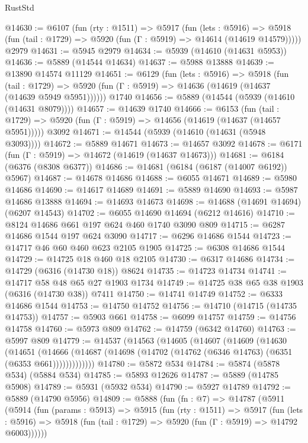 \begin{lexlean}{RustStd}
\begin{coremodule}
@14630 := @6107
    (fun (rty : @1511) =>
    @5917
      (fun (lets : @5916) =>
      @5918 (fun (tail : @1729) => @5920 (fun (Γ : @5919) => @14614 (@14619 @14579)))))
    @2979
@14631 := @5945 @2979
@14634 := @5939 (@14610 (@14631 @5953))
@14636 := @5889 (@14544 @14634)
@14637 := @5988 @13888
@14639 := @13890 @14574 @11129
@14651 := @6129
    (fun (lets : @5916) =>
    @5918
      (fun (tail : @1729) =>
      @5920 (fun (Γ : @5919) => @14636 (@14619 (@14637 (@14639 @5949 @5951))))))
    @1740
@14656 := @5889 (@14544 (@5939 (@14610 (@14631 @8079))))
@14657 := @14639 @1740
@14666 := @6153
    (fun (tail : @1729) => @5920 (fun (Γ : @5919) => @14656 (@14619 (@14637 (@14657 @5951)))))
    @3092
@14671 := @14544 (@5939 (@14610 (@14631 (@5948 @3093))))
@14672 := @5889 @14671
@14673 := @14657 @3092
@14678 := @6171 (fun (Γ : @5919) => @14672 (@14619 (@14637 @14673)))
@14681 := @6184 (@6376 (@8308 @6377))
@14686 := @14681 (@6184 (@6187 (@14007 @6192)) @5967)
@14687 := @14678 @14686
@14688 := @6055 @14671
@14689 := @5980 @14686
@14690 := @14617 @14689
@14691 := @5889 @14690
@14693 := @5987 @14686 @13888
@14694 := @14693 @14673
@14698 := @14688 (@14691 @14694) (@6207 @14543)
@14702 := @6055 @14690 @14694 (@6212 @14616)
@14710 := @8124 @14686 @661 @197 @624 @460 @1740 @3090 @809
@14715 := @6287 @14686 @1544 @197 @624 @3090
@14717 := @6296 @14686 @1544
@14723 := @14717 @46 @60 @460 @623 @2105 @1905
@14725 := @6308 @14686 @1544
@14729 := @14725 @18 @460 @18 @2105
@14730 := @6317 @14686
@14734 := @14729 (@6316 (@14730 @18)) @8624
@14735 := @14723 @14734
@14741 := @14717 @58 @48 @65 @27 @1903 @1734
@14749 := @14725 @38 @65 @38 @1903 (@6316 (@14730 @38)) @7411
@14750 := @14741 @14749
@14752 := @6333 @14686 @1544
@14753 := @14750 @14752
@14756 := @14710 (@14715 (@14735 @14753))
@14757 := @5903 @661
@14758 := @6099 @14757
@14759 := @14756 @14758
@14760 := @5973 @809
@14762 := @14759 (@6342 @14760)
@14763 := @5997 @809
@14779 := @14537
    (@14563
      (@14605
        (@14607
          (@14609
            (@14630
              (@14651
                (@14666
                  (@14687 (@14698 (@14702 (@14762 (@6346 @14763) (@6351 (@6353 @661)))))))))))))
@14780 := @5872 @534
@14784 := @5874 (@5878 @534) (@5884 @534)
@14785 := @5893 @12626
@14787 := @5889 (@14785 @5908)
@14789 := @5931 (@5932 @534)
@14790 := @5927 @14789
@14792 := @5889 (@14790 @5956)
@14809 := @5888
    (fun (fn : @7) =>
    @14787
      (@5911
        (@5914
          (fun (params : @5913) =>
          @5915
            (fun (rty : @1511) =>
            @5917
              (fun (lets : @5916) =>
              @5918 (fun (tail : @1729) => @5920 (fun (Γ : @5919) => @14792 @6003))))))

\end{coremodule}
\end{lexlean}
